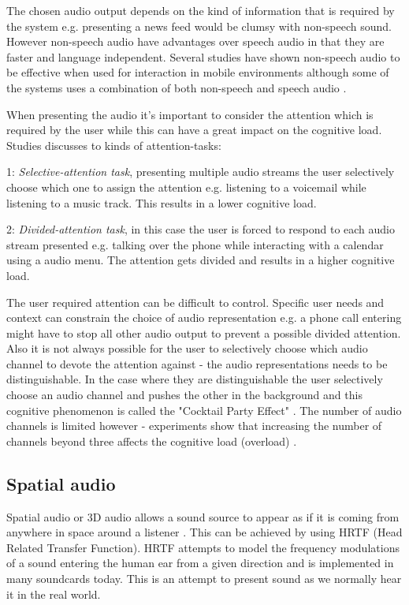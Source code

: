 The chosen audio output depends on the kind of information that is required by the system e.g. presenting a news feed would be clumsy with non-speech sound. However non-speech audio have advantages over speech audio in that they are faster and language independent. Several studies have shown non-speech audio to be effective when used for interaction in mobile environments although some of the systems uses a combination of both non-speech and speech audio \cite{pirhonen_gestural_2002, sawhney_nomadic_2000, brewster_using_2000}.

When presenting the audio it's important to consider the attention which is required by the user while this can have a great impact on the cognitive load. Studies \cite{vazquez-alvarez_eyes-free_2011, shinn-cunningham_selective_2004} discusses to kinds of attention-tasks:

\begin{description}
\item{1: \textit{Selective-attention task}}, presenting multiple audio streams the user selectively choose which one to assign the attention e.g. listening to a voicemail while listening to a music track. This results in a lower cognitive load.

\item{2: \textit{Divided-attention task}}, in this case the user is forced to respond to each audio stream presented e.g. talking over the phone while interacting with a calendar using a audio menu. The attention gets divided and results in a higher cognitive load.
\end{description}

The user required attention can be difficult to control. Specific user needs and context can constrain the choice of audio representation e.g. a phone call entering might have to stop all other audio output to prevent a possible divided attention. Also it is not always possible for the user to selectively choose which audio channel to devote the attention against - the audio representations needs to be distinguishable. In the case where they are distinguishable the user selectively choose an audio channel and pushes the other in the background and this cognitive phenomenon is called the "Cocktail Party Effect" \cite{bronkhorst_cocktail_2000}. The number of audio channels is limited however - experiments show that increasing the number of channels beyond three affects the cognitive load (overload) \cite{bronkhorst_cocktail_2000}.

\subsection{Spatial audio}
Spatial audio or 3D audio allows a sound source to appear as if it is coming from anywhere in space around a listener \cite{begault_3dd_1994}. This can be achieved by using HRTF (Head Related Transfer Function). HRTF attempts to model the frequency modulations of a sound entering the human ear from a given direction and is implemented in many soundcards today. This is an attempt to present sound as we normally hear it in the real world.

